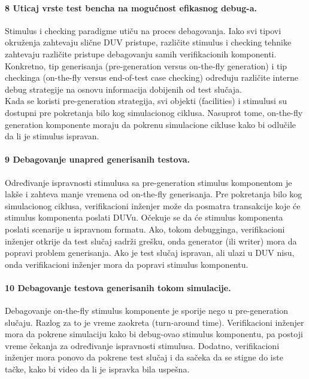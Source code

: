 \documentclass[a4paper, 12pt]{article}
\begin{document}
\paragraph{8 Uticaj vrste test bencha na mogućnost efikasnog debug-a.}
\hfill \break
\indent Stimulus i checking paradigme utiču na proces debagovanja. Iako svi tipovi okruženja zahtevaju slične DUV pristupe, različite stimulus i checking tehnike zahtevaju različite pristupe debagovanju samih verifikacionih komponenti. Konkretno, tip generisanja (pre-generation versus on-the-fly generation) i tip checkinga (on-the-fly versus end-of-test case checking) određuju različite interne debug strategije na osnovu informacija dobijenih od test slučaja.\\
\indent Kada se koristi pre-generation strategija, svi objekti (facilities) i stimulusi su dostupni pre pokretanja bilo kog simulacionog ciklusa. Nasuprot tome, on-the-fly generation komponente moraju da pokrenu simulacione cikluse kako bi odlučile da li je stimulus ispravan.
\paragraph{9 Debagovanje unapred generisanih testova.}
\hfill \break
\indent Određivanje ispravnosti stimulusa sa pre-generation stimulus komponentom je lakše i zahteva manje vremena od on-the-fly generisanja. Pre pokretanja bilo kog simulacionog ciklusa, verifikacioni inženjer može da posmatra transakcije koje će stimulus komponenta poslati DUVu. Očekuje se da će stimulus komponenta poslati scenarije u ispravnom formatu. Ako, tokom debugginga, verifikacioni inženjer otkrije da test slučaj sadrži grešku, onda generator (ili writer) mora da popravi problem generisanja. Ako je test slučaj ispravan, ali ulazi u DUV nisu, onda verifikacioni inženjer mora da popravi stimulus komponentu.
\paragraph{10 Debagovanje testova generisanih tokom simulacije.}
\hfill \break
\indent Debagovanje on-the-fly stimulus komponente je sporije nego u pre-generation slučaju. Razlog za to je vreme zaokreta (turn-around time). Verifikacioni inženjer mora da pokrene simulaciju kako bi debug-ovao stimulus komponentu, pa postoji vreme čekanja za određivanje ispravnosti stimulusa. Dodatno, verifikacioni inženjer mora ponovo da pokrene test slučaj i da sačeka da se stigne do iste tačke, kako bi video da li je ispravka bila uspešna.
\end{document}
